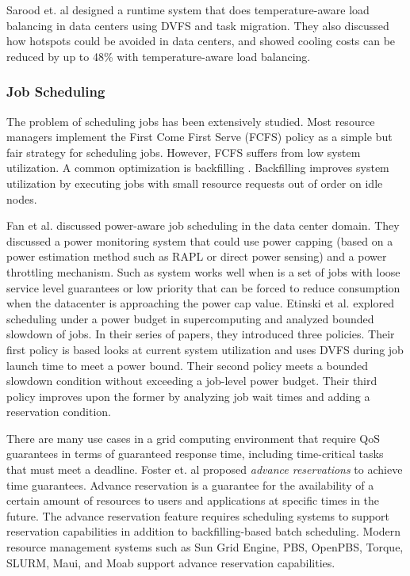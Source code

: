 Sarood et. al \cite{SaroodSC11} designed a runtime system that does temperature-aware load balancing in data centers using DVFS and task migration. They also discussed how hotspots could be avoided in data centers, and showed cooling costs can be reduced by up to 48\% with temperature-aware load balancing.

\subsubsection{Job Scheduling}
The problem of scheduling jobs has been extensively studied. Most resource managers implement the First Come First Serve (FCFS) policy
as a simple but fair strategy for scheduling jobs. However, FCFS suffers from low system utilization. A common optimization is backfilling
\cite{lifka_anl/ibm_1995,mualem_utilization_2001,feitelson_parallel_2004}. Backfilling improves system utilization by executing jobs with small resource requests out of order on idle nodes.

Fan et al. \cite{PowerAwareServer1} discussed power-aware job scheduling in the data center domain. 
They discussed a power monitoring system that could use power capping (based on a power estimation method such as RAPL or direct power sensing) and a power throttling mechanism. Such as system works well when is a set of jobs with loose service level guarantees or low priority that can be
forced to reduce consumption when the datacenter is approaching the power cap value. Etinski et al. \cite{Etinski1,Etinski2,Etinski3,Etinski4} explored scheduling under a power budget in supercomputing and analyzed bounded slowdown of jobs. In their series of papers, they introduced three policies. Their first policy is based looks at current system utilization and uses DVFS during job launch time to meet a power bound. Their second policy meets a bounded slowdown condition without exceeding a job-level power budget. Their third policy improves upon the former by analyzing job wait times and adding a reservation condition. 

There are many use cases in a grid computing environment that require QoS
guarantees in terms of guaranteed response time, including time-critical
tasks that must meet a deadline. Foster et. al \cite{foster_distributed_1999,foster_anatomy_2001} proposed \emph{advance reservations} to achieve time guarantees. Advance reservation is a guarantee for the availability of a certain amount of resources to users and applications at specific times in the future. The advance reservation feature requires scheduling systems to support reservation capabilities in addition to backfilling-based batch scheduling. Modern resource management systems such as Sun Grid Engine, PBS, OpenPBS, Torque, SLURM, Maui, and Moab support advance reservation capabilities.

